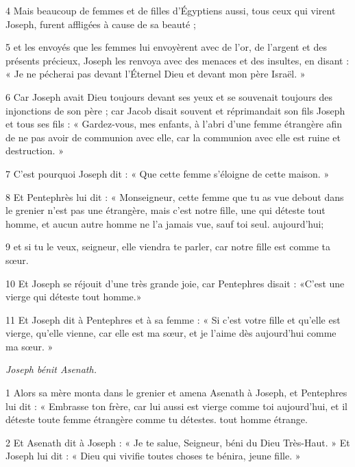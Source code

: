 \par 4 Mais beaucoup de femmes et de filles d'Égyptiens aussi, tous ceux qui virent Joseph, furent affligées à cause de sa beauté ;

\par 5 et les envoyés que les femmes lui envoyèrent avec de l'or, de l'argent et des présents précieux, Joseph les renvoya avec des menaces et des insultes, en disant : « Je ne pécherai pas devant l'Éternel Dieu et devant mon père Israël. »

\par 6 Car Joseph avait Dieu toujours devant ses yeux et se souvenait toujours des injonctions de son père ; car Jacob disait souvent et réprimandait son fils Joseph et tous ses fils : « Gardez-vous, mes enfants, à l'abri d'une femme étrangère afin de ne pas avoir de communion avec elle, car la communion avec elle est ruine et destruction. »

\par 7 C'est pourquoi Joseph dit : « Que cette femme s'éloigne de cette maison. »

\par 8 Et Pentephrès lui dit : « Monseigneur, cette femme que tu as vue debout dans le grenier n'est pas une étrangère, mais c'est notre fille, une qui déteste tout homme, et aucun autre homme ne l'a jamais vue, sauf toi seul. aujourd'hui;

\par 9 et si tu le veux, seigneur, elle viendra te parler, car notre fille est comme ta sœur.

\par 10 Et Joseph se réjouit d'une très grande joie, car Pentephres disait : «C'est une vierge qui déteste tout homme.»

\par 11 Et Joseph dit à Pentephres et à sa femme : « Si c'est votre fille et qu'elle est vierge, qu'elle vienne, car elle est ma sœur, et je l'aime dès aujourd'hui comme ma sœur. »



\par \textit{Joseph bénit Asenath.}

\par 1 Alors sa mère monta dans le grenier et amena Asenath à Joseph, et Pentephres lui dit : « Embrasse ton frère, car lui aussi est vierge comme toi aujourd'hui, et il déteste toute femme étrangère comme tu détestes. tout homme étrange.

\par 2 Et Asenath dit à Joseph : « Je te salue, Seigneur, béni du Dieu Très-Haut. » Et Joseph lui dit : « Dieu qui vivifie toutes choses te bénira, jeune fille. »

